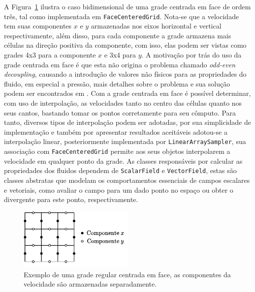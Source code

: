 \documentclass[12pt,a4paper,dvipsnames]{article}
\newcommand{\figref}[1]{Figura~\ref{#1}}
\begin{document}
A \figref{fig:facecenteredgrid} ilustra o caso bidimensional de uma grade centrada em face de ordem três, tal como implementada em \texttt{FaceCenteredGrid}. Nota-se que a velocidade tem suas componentes $x$ e $y$ armazenadas nos eixos horizontal e vertical respectivamente, além disso, para cada componente a grade armazena mais células na direção positiva da componente, com isso, elas podem ser vistas como grades 4x3 para a componente $x$ e 3x4 para $y$. A motivação por trás do uso da grade centrada em face é que esta não origina o problema chamado \textit{odd-even decoupling}, causando a introdução de valores não físicos para as propriedades do fluido, em especial a pressão, mais detalhes sobre o problema e sua solução podem ser encontrados em \cite{RAUWOENS200779}. Com a grade centrada em face é possível determinar, com uso de interpolação, as velocidades tanto no centro das células quanto nos seus cantos, bastando tomar os pontos corretamente para seu cômputo. Para tanto, diversos tipos de interpolação podem ser adotadas, por sua simplicidade de implementação e também por apresentar resultados aceitáveis adotou-se a interpolação linear, posteriormente implementada por \texttt{LinearArraySampler}, sua associação com \texttt{FaceCenteredGrid} permite aos seus objetos interpolarem a velocidade em qualquer ponto da grade. As classes responsáveis por calcular as propriedades dos fluidos dependem de \texttt{ScalarField} e \texttt{VectorField}, estas são classes abstratas que modelam os comportamentos essenciais de campos escalares e vetoriais, como avaliar o campo para um dado ponto no espaço ou obter o divergente para este ponto, respectivamente.

\begin{figure}[ht]
    \centering
    \includegraphics[width=0.5\textwidth]{FaceCenteredGrid.pdf}
    \caption{Exemplo de uma grade regular centrada em face, as componentes da velocidade são armazenadas separadamente.}
    \label{fig:facecenteredgrid}
\end{figure}
\end{document}
